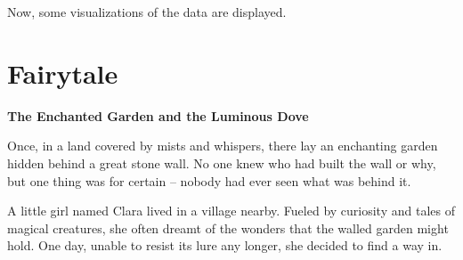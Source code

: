 \documentclass[10pt, a4paper, titlepage]{article} %
\begin{document}
Now, some visualizations of the data are displayed.


\section{Fairytale}

\textbf{The Enchanted Garden and the Luminous Dove}

Once, in a land covered by mists and whispers, there lay an enchanting garden hidden behind a great stone wall. No one knew who had built the wall or why, but one thing was for certain – nobody had ever seen what was behind it.

A little girl named Clara lived in a village nearby. Fueled by curiosity and tales of magical creatures, she often dreamt of the wonders that the walled garden might hold. One day, unable to resist its lure any longer, she decided to find a way in.
\end{document}
